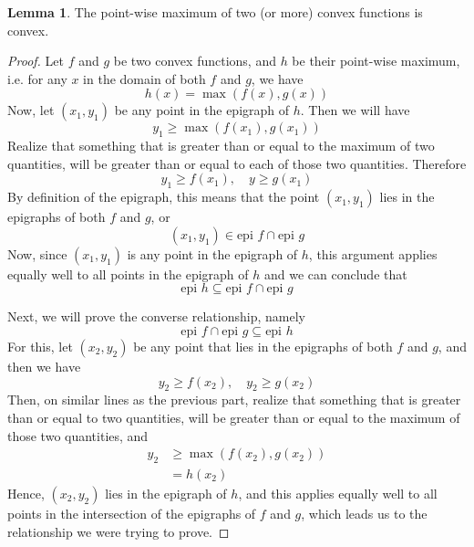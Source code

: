 \documentclass[a4paper]{article}
\theoremstyle{definition}
\newtheorem{lemma}{Lemma}[subsection]
\begin{document}
\begin{lemma}
	The point-wise maximum of two (or more) convex functions is convex.
\end{lemma}
\begin{proof}
	Let $f$ and $g$ be two convex functions, and $h$ be their point-wise maximum, i.e. for any $x$ in the domain of both $f$ and $g$, we have
	\begin{equation*}
		h(x) = \max (f(x), g(x))
	\end{equation*}
	Now, let $(x_1, y_1)$ be any point in the epigraph of $h$. Then we will have
	\begin{equation*}
		y_1 \geq \max (f(x_1), g(x_1))
	\end{equation*}
	Realize that something that is greater than or equal to the maximum of two quantities, will be greater than or equal to each of those two quantities.
	Therefore
	\begin{equation*}
		y_1 \geq f(x_1), \quad y \geq g(x_1)
	\end{equation*}
	By definition of the epigraph, this means that the point $(x_1, y_1)$ lies in the epigraphs of both $f$ and $g$, or
	\begin{equation*}
		(x_1, y_1) \in \text{epi } f \cap \text{epi } g
	\end{equation*}
	Now, since $(x_1, y_1)$ is any point in the epigraph of $h$, this argument applies equally well to all points in the epigraph of $h$ and we can conclude that
	\begin{equation*}
		\text{epi } h \subseteq \text{epi } f \cap \text{epi } g
	\end{equation*}

	Next, we will prove the converse relationship, namely
	\begin{equation*}
		\text{epi } f \cap \text{epi } g \subseteq \text{epi } h
	\end{equation*}
	For this, let $(x_2, y_2)$ be any point that lies in the epigraphs of both $f$ and $g$, and then we have
	\begin{equation*}
		y_2 \geq f(x_2), \quad y_2 \geq g(x_2)
	\end{equation*}
	Then, on similar lines as the previous part, realize that something that is greater than or equal to two quantities, will be greater than or equal to the maximum of those two quantities, and
	\begin{align*}
		y_2 & \geq \max(f(x_2), g(x_2)) \\
		& = h(x_2)
	\end{align*}
	Hence, $(x_2, y_2)$ lies in the epigraph of $h$, and this applies equally well to all points in the intersection of the epigraphs of $f$ and $g$, which leads us to the relationship we were trying to prove.


\end{proof}
\end{document}
